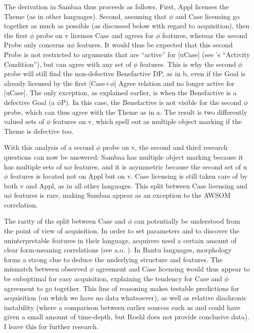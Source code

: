 \documentclass[output=paper
,modfonts
,nonflat]{langsci/langscibook}
\begin{document}
The derivation in Sambaa thus proceeds as follows. First, Appl licenses the Theme (as in other languages). Second, assuming that $\phi$ and Case licensing go together as much as possible (as discussed below with regard to acquisition), then the first $\phi$ probe on v licenses Case and agrees for $\phi$ features, whereas the second Probe only concerns u$\phi$ features. It would thus be expected that this second Probe is not restricted to arguments that are ``active'' for [uCase] (see \citeauthor{Chomsky2001}'s \citeyear{Chomsky2001} ``Activity Condition''), but can agree with any set of $\phi$ features. This is why the second $\phi$ probe will still find the non-defective Benefactive DP, as in b, even if the Goal is already licensed by the first [Case+$\phi$] Agree relation and no longer active for [uCase]. The only exception, as explained earlier, is when the Benefactive is a defective Goal (a $\phi$P). In this case, the Benefactive is not visible for the second $\phi$ probe, which can thus agree with the Theme as in a. The result is two differently valued sets of $\phi$ features on v, which spell out as multiple object marking if the Theme is defective too.

With this analysis of a second $\phi$ probe on v, the second and third research questions can now be answered: Sambaa has multiple object marking because it has multiple sets of u$\phi$ features, and it is asymmetric because the second set of u$\phi$ features is located not on Appl but on v. Case licensing is still taken care of by both v and Appl, as in all other languages. This split between Case licensing and u$\phi$ features is rare, making Sambaa appear as an exception to the AWSOM correlation.

The rarity of the split between Case and $\phi$ can potentially be understood from the point of view of acquisition. In order to set parameters and to discover the uninterpretable features in their language, acquirers need a certain amount of clear form-meaning correlations (see a.o. \citealt{Biberauer2017a,Biberauer2017b,Biberauer_Roberts2017,Fasanella_Fortuny2016}). In Bantu languages, morphology forms a strong clue to deduce the underlying structure and features. The mismatch between observed $\phi$ agreement and Case licensing would thus appear to be suboptimal for easy acquisition, explaining the tendency for Case and $\phi$ agreement to go together. This line of reasoning makes testable predictions for acquisition (on which we have no data whatsoever), as well as relative diachronic instability (where a comparison between earlier sources such as \citealt{Roehl1911} and \citealt{Riedel2009} could have given a small amount of time-depth, but Roehl does not provide conclusive data). I leave this for further research.\pagebreak
\end{document}
